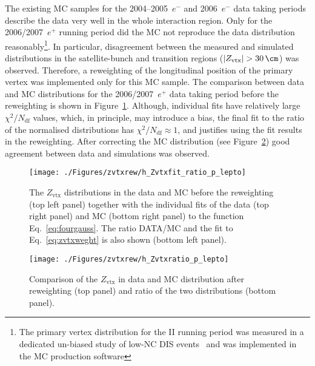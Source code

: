 The existing MC samples for the 2004--2005~$e^-$ and 2006~$e^-$ data taking periods describe the data very well in the whole interaction region. Only for the 2006/2007~$e^+$ running period did the MC not reproduce the data distribution reasonably\footnote{The primary vertex distribution for the \hera II running period was measured in a dedicated un-biased study of low-\qsq NC DIS events~\cite{upub:oliver:zn07008} and was implemented in the MC production software}. In particular, disagreement between the measured and simulated distributions in the satellite-bunch and transition regions ($\left|Z_{\text{vtx}}\right|>30\,\cm$) was observed. Therefore, a reweighting of the longitudinal position of the primary vertex was implemented only for this MC sample. The comparison between data and MC distributions for the 2006/2007~$e^+$ data taking period before the reweighting is shown in Figure~\ref{fig:zvtxrew}. Although, individual fits have relatively large $\chi^2/N_\text{df}$ values, which, in principle, may introduce a bias, the final fit to the ratio of the normalised distributions has $\chi^2/N_\text{df}\approx 1$, and justifies using the fit results in the reweighting. After correcting the MC distribution (see Figure~\ref{fig:zvtxrewaf}) good agreement between data and simulations was observed.
\begin{figure}[t]
\begin{center}
 \hspace{-35pt}\texttt{[image: ./Figures/zvtxrew/h\_Zvtxfit\_ratio\_p\_lepto]}%
\end{center}
\caption{The $Z_\text{vtx}$ distributions in the data and \lepto MC before the reweighting (top left panel) together with the individual fits of the data (top right panel) and MC (bottom right panel) to the function Eq.~\eqref{eq:fourgauss}. The ratio DATA/MC and the fit to Eq.~\eqref{eq:zvtxweght} is also shown (bottom left panel).} 
\label{fig:zvtxrew}
\end{figure}

\begin{figure}[p]
\begin{center}
 \texttt{[image: ./Figures/zvtxrew/h\_Zvtxratio\_p\_lepto]}
\end{center}
\caption{Comparison of the $Z_\text{vtx}$ in data and \lepto MC distribution after reweighting (top panel) and ratio of the two distributions (bottom panel).} 
\label{fig:zvtxrewaf}
\end{figure}